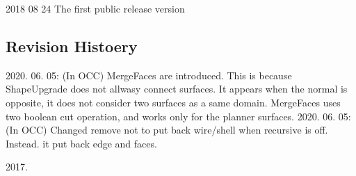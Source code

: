 \documentclass[11pt,a4paper,final]{report}
\begin{document}
2018 08 24  The first public release version

\subsection{Revision Histoery}

2020. 06. 05: (In OCC) MergeFaces are introduced. This is because ShapeUpgrade does not allwasy connect surfaces. It appears when the normal is opposite, it does not consider two surfaces as a same domain. MergeFaces uses two boolean cut operation, and works only for the planner surfaces.
2020. 06. 05: (In OCC) Changed remove not to put back wire/shell when recursive is off. Instead. it put back edge and faces.

2017.
\end{document}
